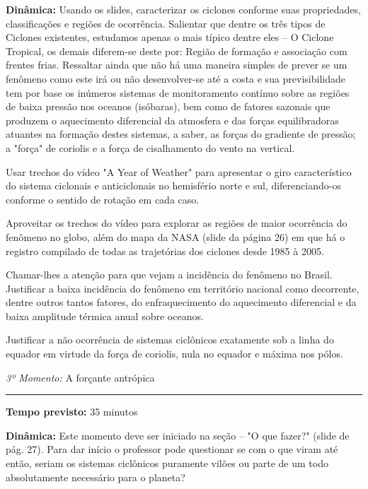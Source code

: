 \documentclass[
12pt,				%
openright,			%
oneside,			%
a4paper,			%
chapter=TITLE,		%
english,			%
brazil				%
]{abntex2}
\begin{document}
\noindent\textbf{Dinâmica:} Usando os slides, caracterizar os ciclones conforme suas propriedades, classificações e regiões de ocorrência. Salientar que dentre os três tipos de Ciclones existentes, estudamos apenas o mais típico dentre eles -- O Ciclone Tropical, os demais diferem-se deste por: Região de formação e associação com frentes frias. Ressaltar ainda que não há uma maneira simples de prever se um fenômeno como este irá ou não desenvolver-se até a costa e sua previsibilidade tem por base os inúmeros sistemas de monitoramento contínuo sobre as regiões de baixa pressão nos oceanos (isóbaras), bem como de fatores sazonais que produzem o aquecimento diferencial da atmosfera e das forças equilibradoras atuantes na formação destes sistemas, a saber, as forças do gradiente de pressão; a "força" de coriolis e a força de cisalhamento do vento na vertical.

Usar trechos do vídeo "A Year of Weather" para apresentar o giro característico do sistema ciclonais e anticiclonais no hemisfério norte e sul, diferenciando-os conforme o sentido de rotação em cada caso.

Aproveitar os trechos do vídeo para explorar as regiões de maior ocorrência do fenômeno no globo, além do mapa da NASA (slide da página 26) em que há o registro compilado de todas as trajetórias dos ciclones desde 1985 à 2005.

Chamar-lhes a atenção para que vejam a incidência do fenômeno no Brasil. Justificar a baixa incidência do fenômeno em território nacional como decorrente, dentre outros tantos fatores, do enfraquecimento do aquecimento diferencial e da baixa amplitude térmica anual sobre oceanos.

Justificar a não ocorrência de sistemas ciclônicos exatamente sob a linha do equador em virtude da força de coriolis, nula no equador e máxima nos pólos.

\vspace{50pt}
\par\noindent\emph{3º Momento:} A forçante antrópica
\par\noindent\rule{.3\textwidth}{.5pt}
\par\noindent\textbf{Tempo previsto:} 35 minutos

\par\noindent\textbf{Dinâmica:} Este momento deve ser iniciado na seção -- "O que fazer?" (slide de pág. 27). Para dar início o professor pode questionar se com o que viram até então, seriam os sistemas ciclônicos puramente vilões ou parte de um todo absolutamente necessário para o planeta?
\end{document}
